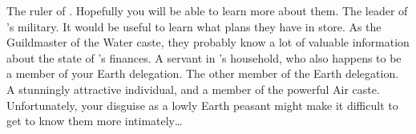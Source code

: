 \documentclass[char]{iron}
\begin{document}
\begin{contacts}
  \contact{\cRoyalty{}} The ruler of \sHomeCountry{}. Hopefully you will be able to learn more about them.
  \contact{\cMulan{}} The leader of \sHomeCountry{}'s military. It would be useful to learn what plans they have in store.
  \contact{\cGuildmaster{}} As the Guildmaster of the Water caste, they probably know a lot of valuable information about the state of \sHomeCountry{}'s finances.
  \contact{\cServant{}} A servant in \cRoyalty{}'s household, who also happens to be a member of your Earth delegation.
  \contact{\cPatriot{}} The other member of the Earth delegation.
  \contact{\cHotPerson{}} A stunningly attractive individual, and a member of the powerful Air caste. Unfortunately, your disguise as a lowly Earth peasant might make it difficult to get to know them more intimately\ldots{}
\end{contacts}
\end{document}
